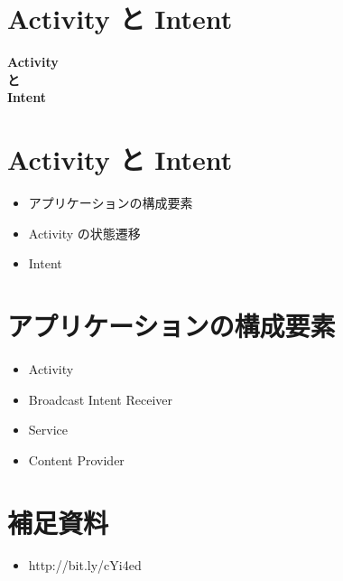 \documentclass[slide,papersize]{jsarticle}
\begin{document}
\section*{Activity と Intent}
\vspace*{8mm}
\begin{center}
{\Huge {\bf Activity\\と\\Intent}}
\end{center}

\section*{Activity と Intent}
\bigskip
\begin{itemize}
\item アプリケーションの構成要素
\bigskip
\item Activity の状態遷移
\bigskip
\item Intent
\end{itemize}

\section*{アプリケーションの構成要素}
\bigskip
\begin{itemize}
\item Activity
\bigskip
\item Broadcast Intent Receiver
\bigskip
\item Service
\bigskip
\item Content Provider
\end{itemize}

\section*{補足資料}
\bigskip
\begin{itemize}
\item http://bit.ly/cYi4ed
\end{itemize}
\end{document}
